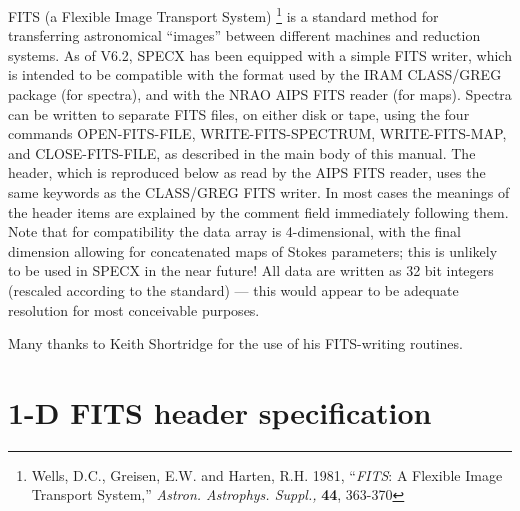 \documentclass[11pt,twoside]{report}
\begin{document}
FITS (a Flexible Image Transport System)
\footnote{Wells, D.C., Greisen, E.W. and Harten, R.H. 1981, ``{\it FITS}: A
Flexible Image Transport System,'' {\it Astron. Astrophys. Suppl.,} {\bf 44},
363-370}
is a standard method for transferring astronomical ``images'' between different
machines and reduction systems. As of V6.2, SPECX has been equipped with a
simple FITS writer, which is intended to be compatible with the format used by
the IRAM CLASS/GREG package (for spectra), and with
the NRAO AIPS FITS reader (for maps). Spectra can be written
to separate FITS files, on either disk or tape, using the four commands
OPEN-FITS-FILE,
WRITE-FITS-SPECTRUM,
WRITE-FITS-MAP,
and CLOSE-FITS-FILE, as described in the
main body of this manual. The header, which is reproduced below as read by the
AIPS
FITS reader, uses the same keywords as the CLASS/GREG FITS writer. In most
cases the meanings of the header items are explained by the comment field
immediately following them. Note that for compatibility the data array is
4-dimensional, with the final dimension allowing for concatenated maps of
Stokes parameters; this is unlikely to be used in SPECX in the near future!
All data are written as 32 bit integers (rescaled according to the standard) ---
this would appear to be adequate resolution for most conceivable purposes.

Many thanks to Keith Shortridge for the use of his FITS-writing routines.

\section{1-D FITS header specification}
\end{document}
